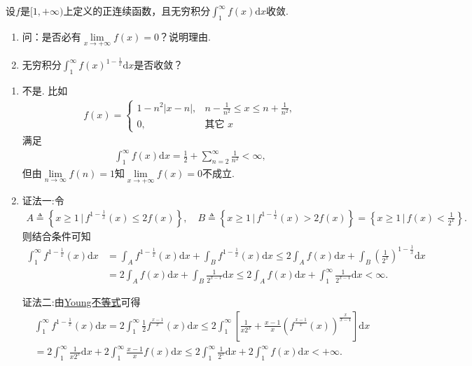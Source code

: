 \documentclass[../../main.tex]{subfiles}%
\begin{document}
\begin{example}
设$f$是$[1,+\infty)$上定义的正连续函数，且无穷积分$\int_{1}^{\infty} f(x) \mathrm{d}x$收敛.
\begin{enumerate}[(1)]
\item 问：是否必有$\lim\limits_{x\to+\infty} f(x) = 0$？说明理由.
\item 无穷积分$\int_{1}^{\infty} f(x)^{1-\frac{1}{x}} \mathrm{d}x$是否收敛？
\end{enumerate}
\end{example}
\begin{solution}
\begin{enumerate}[(1)]
\item 不是. 比如
\begin{align*}
f(x) = 
\begin{cases}
1 - n^2|x - n|, & n - \frac{1}{n^2} \leqslant x \leqslant n + \frac{1}{n^2}, \\
0, & \text{其它 } x
\end{cases}
\end{align*}
满足
\begin{align*}
\int_{1}^{\infty} f(x) \mathrm{d}x = \frac{1}{2} + \sum\limits_{n=2}^{\infty} \frac{1}{n^2} < \infty,
\end{align*}
但由$\lim\limits_{n\to\infty} f(n) = 1$知$\lim\limits_{x\to+\infty} f(x) = 0$不成立.

\item {\color{blue}证法一:}令
\begin{align*}
A\triangleq \left\{ x\geqslant 1\,\big|\, f^{1-\frac{1}{x}}(x) \leqslant 2f(x) \right\},\quad B\triangleq \left\{ x\geqslant 1\,\big|\, f^{1-\frac{1}{x}}(x) > 2f(x) \right\} = \left\{ x\geqslant 1\,\big|\, f(x) < \frac{1}{2^x} \right\}.
\end{align*}
则结合条件可知
\begin{align*}
\int_1^{\infty} f^{1-\frac{1}{x}}(x) \mathrm{d}x
&= \int_A f^{1-\frac{1}{x}}(x) \mathrm{d}x + \int_B f^{1-\frac{1}{x}}(x) \mathrm{d}x
\leqslant 2\int_A f(x) \mathrm{d}x + \int_B \left( \frac{1}{2^x} \right)^{1-\frac{1}{x}} \mathrm{d}x \\
&= 2\int_A f(x) \mathrm{d}x + \int_B \frac{1}{2^{x-1}} \mathrm{d}x
\leqslant 2\int_A f(x) \mathrm{d}x + \int_1^{\infty} \frac{1}{2^{x-1}} \mathrm{d}x
< \infty.
\end{align*}

{\color{blue}证法二:}由\hyperref[theorem:Young不等式]{Young不等式}可得
\begin{align*}
&\int_1^{\infty} f^{1-\frac{1}{x}}(x) \mathrm{d}x
= 2\int_1^{\infty} \frac{1}{2} f^{\frac{x-1}{x}}(x) \mathrm{d}x
\leqslant 2\int_1^{\infty} \left[ \frac{1}{x2^x} + \frac{x-1}{x} \left( f^{\frac{x-1}{x}}(x) \right)^{\frac{x}{x-1}} \right] \mathrm{d}x \\
&= 2\int_1^{\infty} \frac{1}{x2^x} \mathrm{d}x + 2\int_1^{\infty} \frac{x-1}{x} f(x) \mathrm{d}x
\leqslant 2\int_1^{\infty} \frac{1}{2^x} \mathrm{d}x + 2\int_1^{\infty} f(x) \mathrm{d}x
< +\infty.
\end{align*}
\end{enumerate}
\end{solution}
\end{document}

